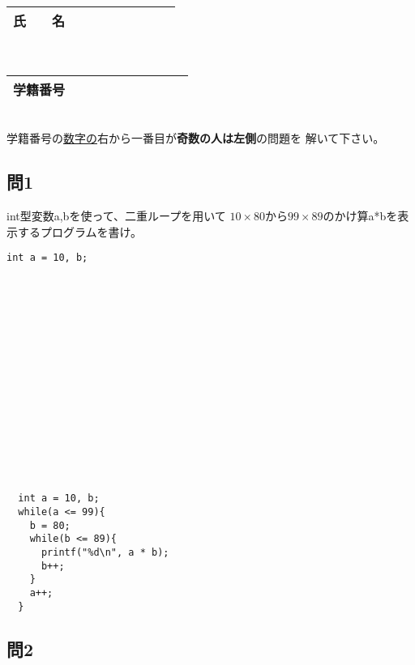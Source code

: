 \documentclass[a4j]{jarticle}
\def\ds{\displaystyle}
\begin{document}
\thispagestyle{empty}

\begin{multicols*}{2}%


\def\subst#1#2{$\ds #1$
 \ $\longrightarrow$\ 
 \underline{\hbox to 5cm{\ttfamily #2}}}



\noindent
\begin{tabular}[t]{|c|cccccccc|}\hline
氏　　名 & & & & & & & & \\ \hline
\end{tabular}\\
\begin{tabular}[t]{|c|c|c|c|c|c|c|c|c|c|}\hline
学籍番号 & & & & & & & & \\ \hline
\end{tabular}\\
学籍番号の\underline{数字の}右から一番目が{\bfseries 奇数の人は左側}の問題を
解いて下さい。
\vspace{-5ex}







\subsection*{問1}


{\ttfamily int型変数a,b}を使って、二重ループを用いて
$10\times80$から$99\times89$のかけ算{\ttfamily a*b}を表示するプログラムを書け。

\ifnum {}
\begin{verbatim}
int a = 10, b;

















\end{verbatim}
\else
\begin{verbatim}
  int a = 10, b;
  while(a <= 99){
    b = 80;
    while(b <= 89){
      printf("%d\n", a * b);
      b++;
    }
    a++;
  }
\end{verbatim}
\vspace{2cm}
\fi



\subsection*{問2}


\end{multicols*}
\end{document}
